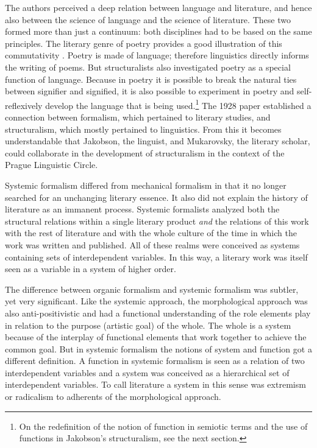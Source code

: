 \documentclass[output=paper]{langscibook}
\begin{document}
The authors perceived a deep relation between language and literature, and hence also between the science of language and the science of literature. These two formed more than just a continuum: both disciplines had to be based on the same principles. The literary genre of poetry provides a good illustration of this commutativity \citep[see][]{Jakobson1981poetry,Jakobson1981landp}. Poetry is made of language; therefore linguistics directly informs the writing of poems. But structuralists also investigated poetry as a special function of language. Because in poetry it is possible to break the natural ties between signifier and signified, it is also possible to experiment in poetry and self-reflexively develop the language that is being used.\footnote{On the redefinition of the notion of function in semiotic terms and the use of functions in Jakobson's structuralism, see the next section.} The 1928 paper established a connection between formalism, which pertained to literary studies, and structuralism, which mostly pertained to linguistics. From this it becomes understandable that Jakobson, the linguist, and Mukarovsky, the literary scholar, could collaborate in the development of structuralism in the context of the Prague Linguistic Circle. 

Systemic formalism differed from mechanical formalism in that it no longer searched for an unchanging literary essence. It also did not explain the history of literature as an immanent process. Systemic formalists analyzed both the structural relations within a single literary product \emph{and} the relations of this work with the rest of literature and with the whole culture of the time in which the work was written and published. All of these realms were conceived as systems containing sets of interdependent variables. In this way, a literary work was itself seen as a variable in a system of higher order.  

The difference between organic formalism and systemic formalism was subtler, yet very significant. Like the systemic approach, the morphological approach was also anti-positivistic and had a functional understanding of the role elements play in relation to the purpose (artistic goal) of the whole. The whole is a system because of the interplay of functional elements that work together to achieve the common goal. But in systemic formalism the notions of system and function got a different definition. A function in systemic formalism is seen as a relation of two interdependent variables and a system was conceived as a hierarchical set of interdependent variables. To call literature a system in this sense was extremism or radicalism to adherents of the morphological approach.
\end{document}
